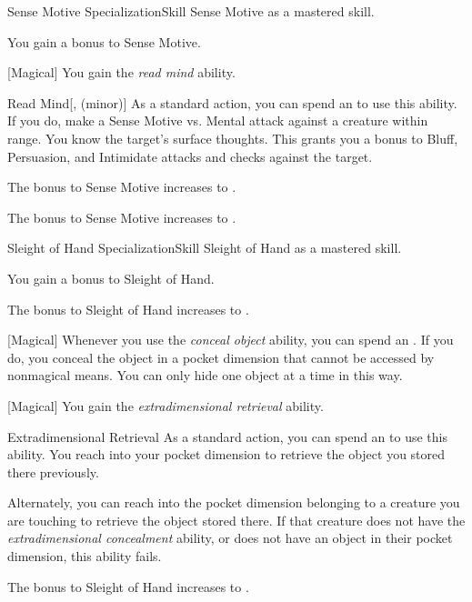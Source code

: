     \begin{feat}{Sense Motive Specialization}{Skill}
        \featpre Sense Motive as a mastered skill.

         You gain a  bonus to Sense Motive.

        [Magical] You gain the \textit{read mind} ability.
        \begin{ability}{Read Mind}[,  (minor)]
            As a standard action, you can spend an  to use this ability.
            If you do, make a Sense Motive vs. Mental attack against a creature within \rngclose range.
            \hit You know the target's surface thoughts.
            This grants you a  bonus to Bluff, Persuasion, and Intimidate attacks and checks against the target.
        \end{ability}

         The bonus to Sense Motive increases to .

         The bonus to Sense Motive increases to .
    \end{feat}

    \begin{feat}{Sleight of Hand Specialization}{Skill}
        \featpre Sleight of Hand as a mastered skill.

         You gain a  bonus to Sleight of Hand.

        \ff[2]{}

         The bonus to Sleight of Hand increases to .

        [Magical] Whenever you use the \textit{conceal object} ability, you can spend an .
        If you do, you conceal the object in a pocket dimension that cannot be accessed by nonmagical means.
        You can only hide one object at a time in this way.

        [Magical] You gain the \textit{extradimensional retrieval} ability.
        \begin{ability}{Extradimensional Retrieval}
            As a standard action, you can spend an  to use this ability.
            You reach into your pocket dimension to retrieve the object you stored there previously.

            Alternately, you can reach into the pocket dimension belonging to a creature you are touching to retrieve the object stored there.
            If that creature does not have the \textit{extradimensional concealment} ability, or does not have an object in their pocket dimension, this ability fails.
        \end{ability}

         The bonus to Sleight of Hand increases to .
    \end{feat}

